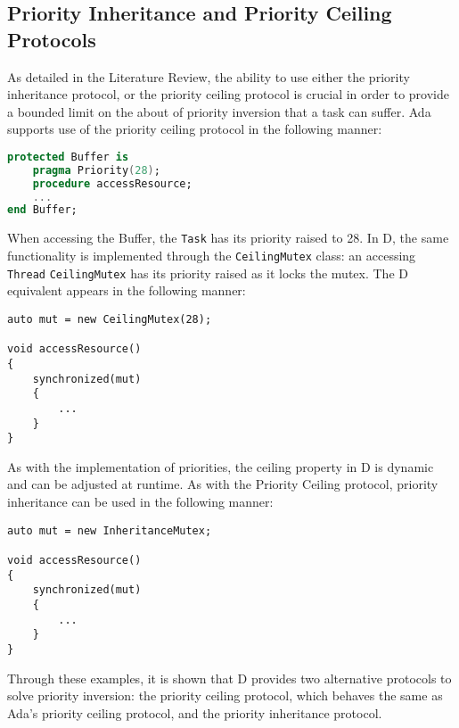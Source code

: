 \subsection{Priority Inheritance and Priority Ceiling Protocols}
As detailed in the Literature Review, the ability to use either the priority
inheritance protocol, or the priority ceiling protocol is crucial in order to
provide a bounded limit on the about of priority inversion that a task can
suffer. Ada supports use of the priority ceiling protocol in the following
manner: 
\begin{lstlisting}[basicstyle=\small,language=Ada]
protected Buffer is 
    pragma Priority(28); 
    procedure accessResource; 
    ...
end Buffer; 
\end{lstlisting}
When accessing the Buffer, the \texttt{Task} has its priority raised
to 28. 
In D, the same functionality is implemented through 
the \texttt{CeilingMutex} class: an accessing \texttt{Thread} 
\texttt{CeilingMutex} has its priority raised as it locks the mutex. 
The D equivalent appears in the following manner: 
\begin{lstlisting}[basicstyle=\small]
auto mut = new CeilingMutex(28); 

void accessResource()
{
    synchronized(mut)
    {
        ...
    }
}
\end{lstlisting}
As with the implementation of priorities, the ceiling property in D is dynamic 
and can be adjusted at runtime. 
As with the Priority Ceiling protocol, priority inheritance can be used in the 
following manner: 
\begin{lstlisting}[basicstyle=\small]
auto mut = new InheritanceMutex; 

void accessResource()
{
    synchronized(mut)
    {
        ...
    }
}
\end{lstlisting}
Through these examples, it is shown that D provides two alternative protocols
to solve priority inversion: the priority ceiling protocol, which behaves the
same as Ada's priority ceiling protocol, and the priority inheritance protocol. 

